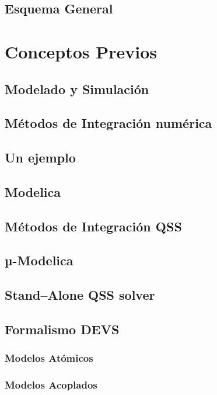 	\subsection{Esquema General}
\section{Conceptos Previos}
	\subsection{Modelado y Simulación}
	\subsection{Métodos de Integración numérica}
	\subsection{Un ejemplo}
	\subsection{Modelica}
	\subsection{Métodos de Integración QSS}
	\subsection{µ-Modelica}
	\subsection{Stand–Alone QSS solver}
	\subsection{Formalismo DEVS}
		\subsubsection{Modelos Atómicos}
		\subsubsection{Modelos Acoplados}
		\subsubsection{Modelos Vectoriales}
	\subsection{PowerDEVS}
